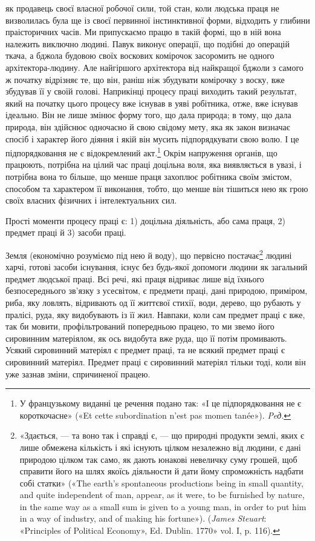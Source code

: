 \parcont{}  %
як продавець своєї власної робочої сили, той стан, коли людська
праця не визволилась була ще із своєї первинної інстинктивної
форми, відходить у глибини праісторичних часів. Ми припускаємо
працю в такій формі, що в ній вона належить виключно людині.
Павук виконує операції, що подібні до операцій ткача, а бджола
будовою своїх воскових комірочок засоромить не одного архітектора-людину.
Але найгіршого архітектора від найкращої
бджоли з самого ж початку відрізняє те, що він, раніш ніж збудувати
комірочку з воску, вже збудував її у своїй голові. Наприкінці
процесу праці виходить такий результат, який на початку
цього процесу вже існував в уяві робітника, отже, вже
існував ідеально. Він не лише змінює форму того, що дала природа;
в тому, що дала природа, він здійснює одночасно й свою
свідому мету, яка як закон визначає спосіб і характер його діяння
і якій він мусить підпорядкувати свою волю. І це підпорядковання
не є відокремлений акт.\footnote*{
У французькому виданні це речення подано так: «І це підпорядковання
не є короткочасне» («Et cette subordination n’est pas momen
tanée»). \emph{Peд}.
} Окрім напруження органів, що працюють,
потрібна на цілий час праці доцільна воля, яка виявляється
в увазі, і потрібна вона то більше, що менше праця захоплює
робітника своїм змістом, способом та характером її виконання,
тобто, що менше він тішиться нею як грою своїх власних
фізичних і інтелектуальних сил.

Прості моменти процесу праці є: 1) доцільна діяльність, або
сама праця, 2) предмет праці й 3) засоби праці.

Земля (економічно розуміємо під нею й воду), що первісно
постачає\footnote{«Здається, — та воно так і справді є, — що природні продукти
землі, яких є лише обмежена кількість і які існують цілком незалежно
від людини, є дані природою цілком так само, як дають юнакові невеличку
суму грошей, щоб справити його на шлях якоїсь діяльности й дати йому
спроможність надбати собі статки» («The earth’s spontaneous productions
being in small quantity, and quite independent of man, appear,
as it were, to be furnished by nature, in the same way as a small sum is given
to a young man, in order to put him in a way of industry, and of making
his fortune»). (\emph{James Steuart}: «Principles of Political Economy», Ed.
Dublin. 1770» vol. I, p. 116).}
людині харчі, готові засоби існування, існує без будь-якої
допомоги людини як загальний предмет людської праці.
Всі речі, які праця відриває лише від їхнього безпосереднього
зв’язку з усесвітом, є предмети праці, дані природою, приміром,
риба, яку ловлять, відривають од її життєвої стихії, води, дерево,
що рубають у пралісі, руда, яку видобувають із її жил. Навпаки, коли сам предмет праці є вже, так би мовити, профільтрований
попередньою працею, то ми звемо його сировинним матеріялом,
як ось видобута вже руда, що її потім промивають. Усякий сировинний
матеріял є предмет праці, та не всякий предмет праці є
сировинний матеріял. Предмет праці є сировинний матеріял тільки
тоді, коли він уже зазнав зміни, спричиненої працею.

